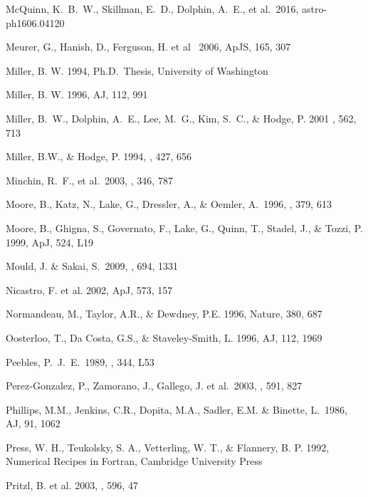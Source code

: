 \documentclass[12pt,onecolumn]{emulateapj}
\begin{document}
\begin{thebibliography}{}
McQuinn, K.~B.~W., Skillman, E.~D., Dolphin, A.~E., et al.\ 2016, astro-ph1606.04120

Meurer, G., Hanish, D., Ferguson, H. et al \ 2006, ApJS, 165, 307 

Miller, B. W. 1994, Ph.D.\ Thesis, University of Washington

Miller, B. W. 1996, AJ, 112, 991 

Miller, B.~W., Dolphin, A.~E., Lee, M.~G., Kim, S.~C., \& Hodge, P. 2001
\apj , 562, 713

Miller, B.W., \& Hodge, P. 1994, \apj , 427, 656

Minchin, R.~F., et al.\ 2003, \mnras, 346, 787 

Moore, B., Katz, N., Lake, G., Dressler, A., \& Oemler, A.\ 1996, \nat, 379, 613 

Moore, B., Ghigna, S., Governato, F., Lake, G., Quinn, T., Stadel, J., \&
Tozzi, P. 1999, ApJ, 524, L19

Mould, J. \& Sakai, S.\ 2009, \apj, 694, 1331

Nicastro, F. et al. 2002, ApJ, 573, 157

Normandeau, M., Taylor, A.R., \& Dewdney, P.E. 1996, Nature, 380, 687

Oosterloo, T., Da Costa, G.S., \& Staveley-Smith, L. 1996, AJ, 112, 1969

Peebles, P.~J.~E.\ 1989, \apjl, 344, L53 

Perez-Gonzalez, P., Zamorano, J., Gallego, J. et al.\ 2003, \apj, 591, 827 

Phillips, M.M., Jenkins, C.R., Dopita, M.A., Sadler, E.M. \& Binette, L.\ 1986, AJ, 91, 1062

Press, W. H., Teukolsky, S. A., Vetterling, W. T., \& Flannery, B. P. 1992,
Numerical Recipes in Fortran, Cambridge University Press

Pritzl, B. et al. 2003, \apj, 596, 47


\end{thebibliography}
\end{document}
